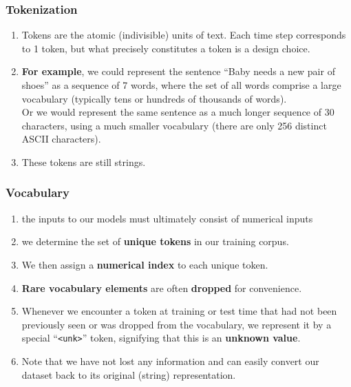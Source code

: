 \subsubsection{Tokenization \cite{dnn-1}}

\begin{enumerate}
    \item Tokens are the atomic (indivisible) units of text. Each time step corresponds to 1 token, but what precisely constitutes a token is a design choice. 
    
    \item \textbf{For example}, we could represent the sentence “Baby needs a new pair of shoes” as a sequence of 7 words, where the set of all words comprise a large vocabulary (typically tens or hundreds of thousands of words).\\
    Or we would represent the same sentence as a much longer sequence of 30 characters, using a much smaller vocabulary (there are only 256 distinct ASCII characters).

    \item These tokens are still strings.

\end{enumerate}

\subsubsection{Vocabulary \cite{dnn-1}}

\begin{enumerate}
    \item the inputs to our models must ultimately consist of numerical inputs

    \item we determine the set of \textbf{unique tokens} in our training corpus. 
    
    \item We then assign a \textbf{numerical index} to each unique token. 
    
    \item \textbf{Rare vocabulary elements} are often \textbf{dropped} for convenience. 
    
    \item Whenever we encounter a token at training or test time that had not been previously seen or was dropped from the vocabulary, we represent it by a special “\verb|<unk>|” token, signifying that this is an \textbf{unknown value}.

    \item Note that we have not lost any information and can easily convert our dataset back to its original (string) representation.

\end{enumerate}


